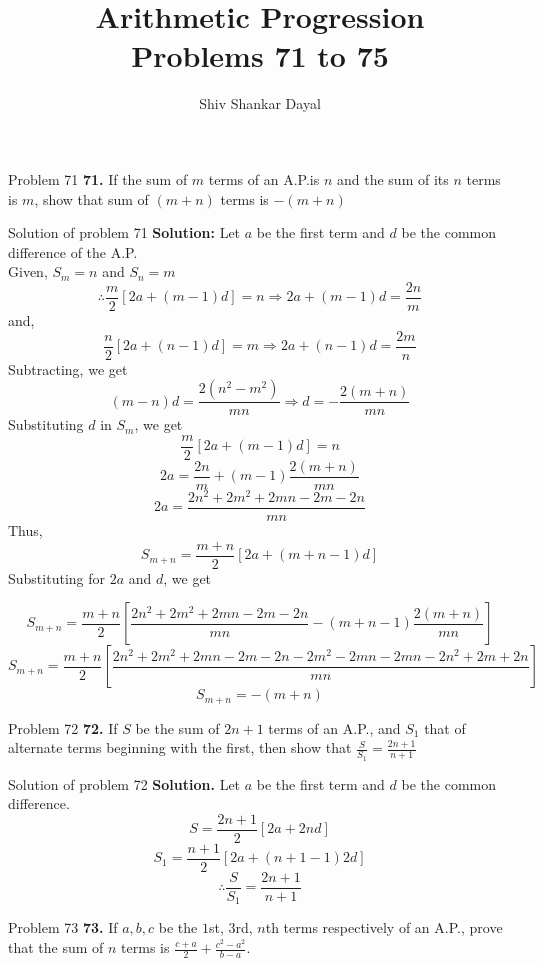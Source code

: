 \documentclass[aspectratio=1610,8pt]{beamer}
\title{Arithmetic Progression\\Problems 71 to 75}
\author[Shiv Shankar Dayal]{Shiv Shankar Dayal}
\begin{document}
\begin{frame}
       \titlepage
\end{frame}
\begin{frame}{Problem 71}
  \textbf{71.} If the sum of $m$ terms of an A.P.is $n$ and the sum of its $n$
  terms is $m$, show that sum of $(m + n)$ terms is $-(m + n)$
\end{frame}
\begin{frame}{Solution of problem 71}
  \textbf{Solution:} Let $a$ be the first term and $d$ be the common difference
  of the A.P.\\
  Given, $S_m = n$ and $S_n = m$\\
  $$\therefore \frac{m}{2}[2a + (m - 1)d] = n\Rightarrow 2a + (m - 1)d = \frac{2n}{m}$$
  and, $$\frac{n}{2}[2a +(n - 1)d] = m \Rightarrow 2a + (n - 1)d = \frac{2m}{n}$$
  Subtracting, we get $$(m - n)d = \frac{2(n^2 - m^2)}{mn} \Rightarrow d =
  -\frac{2(m + n)}{mn}$$
  Substituting $d$ in $S_m$, we get $$\frac{m}{2}[2a + (m - 1)d] = n$$
  $$2a = \frac{2n}{m} + (m - 1)\frac{2(m + n)}{mn}$$
  $$2a = \frac{2n^2 + 2m^2 + 2mn -2m -2n}{mn}$$
  Thus,
  $$S_{m + n} = \frac{m + n}{2}[2a + (m + n - 1)d]$$
  Substituting for $2a$ and $d$, we get
\end{frame}
\begin{frame}
  $$S_{m + n} = \frac{m + n}{2}\left[\frac{2n^2 + 2m^2 + 2mn -2m -2n}{mn} - (m + n -
    1)\frac{2(m + n)}{mn}\right]$$
  $$S_{m + n} = \frac{m + n}{2}\left[\frac{2n^2 + 2m^2 + 2mn -2m -2n -2m^2 -2mn -2mn
      -2n^2 + 2m + 2n}{mn}\right]$$
  $$S_{m + n} = -(m + n)$$
\end{frame}
\begin{frame}{Problem 72}
  \textbf{72.} If $S$ be the sum of $2n + 1$ terms of an A.P., and $S_1$ that
  of alternate terms beginning with the first, then show that $\frac{S}{S_1} =
  \frac{2n + 1}{n + 1}$
\end{frame}
\begin{frame}{Solution of problem 72}
  \textbf{Solution.} Let $a$ be the first term and $d$ be the common
  difference.\\
  $$S = \frac{2n + 1}{2}[2a + 2nd]$$
  $$S_1 = \frac{n + 1}{2}[2a + (n + 1 - 1)2d]$$
  $$\therefore \frac{S}{S_1} = \frac{2n + 1}{n + 1}$$
\end{frame}
\begin{frame}{Problem 73}
  \textbf{73.} If $a, b, c$ be the $1$st, $3$rd, $n$th terms respectively of an
  A.P., prove that the sum of $n$ terms is $\frac{c + a}{2} + \frac{c^2 - a^2}{b
  - a}$.
\end{frame}
\end{document}
